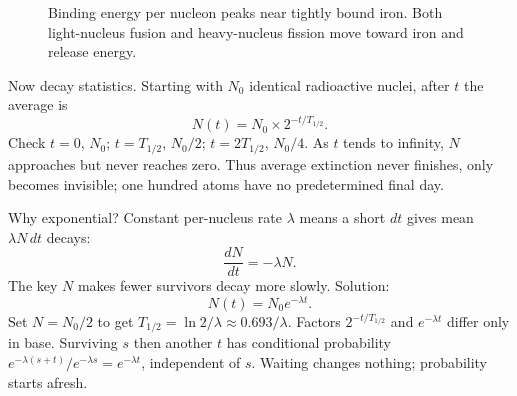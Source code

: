 \begin{figure}[htbp]
\centering
{}
\caption{Binding energy per nucleon peaks near tightly bound iron. Both light-nucleus fusion and heavy-nucleus fission move toward iron and release energy.}
\end{figure}

Now decay statistics. Starting with \(N_0\) identical radioactive nuclei, after \(t\) the average is
\[
N(t)=N_{0}\times2^{-t/T_{1/2}} .
\]
Check \(t=0\), \(N_0\); \(t=T_{1/2}\), \(N_0/2\); \(t=2T_{1/2}\), \(N_0/4\). As \(t\) tends to infinity, \(N\) approaches but never reaches zero. Thus average extinction never finishes, only becomes invisible; one hundred atoms have no predetermined final day.

\begin{mathbridge}
Why exponential? Constant per-nucleus rate \(\lambda\) means a short \(dt\) gives mean \(\lambda N\,dt\) decays:
\[
\frac{dN}{dt}=-\lambda N .
\]
The key \(N\) makes fewer survivors decay more slowly. Solution:
\[
N(t)=N_{0}e^{-\lambda t}.
\]
Set \(N=N_0/2\) to get \(T_{1/2}=\ln2/\lambda\approx0.693/\lambda\). Factors \(2^{-t/T_{1/2}}\) and \(e^{-\lambda t}\) differ only in base. Surviving \(s\) then another \(t\) has conditional probability \(e^{-\lambda(s+t)}/e^{-\lambda s}=e^{-\lambda t}\), independent of \(s\). Waiting changes nothing; probability starts afresh.
\end{mathbridge}

